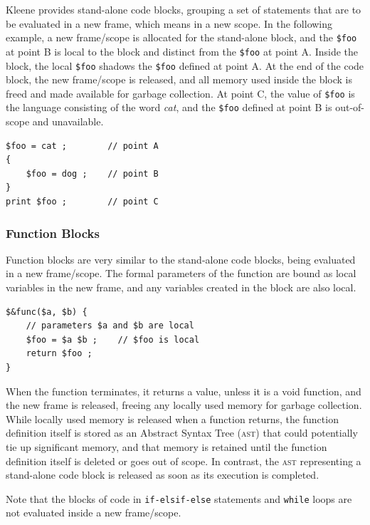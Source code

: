 \documentclass[letterpaper,12pt]{article}
\newcommand{\acro}{\textsc}
\begin{document}
Kleene provides stand-alone code blocks, grouping a set of statements
that are to be evaluated in a new frame, which means in a new scope.
In the following example, a new frame/scope is allocated for the
stand-alone block, and the \verb!$foo! at point B is local to the block
and distinct from the
\verb!$foo! at point A. Inside the block, the local \verb!$foo! shadows
the \verb!$foo! defined at point A.  At the end of the code block, the new
frame/scope is released, and all memory used inside the block is freed
and made available for garbage collection.  At point C, the value of \verb!$foo! is the
language consisting of the word \emph{cat}, and the \verb!$foo! defined
at point B is out-of-scope and unavailable.

\begin{Verbatim}[fontsize=\small]
$foo = cat ;        // point A
{
    $foo = dog ;    // point B
}
print $foo ;        // point C
\end{Verbatim}

\subsubsection{Function Blocks}

Function blocks are very similar to the stand-alone code blocks, being
evaluated in a new frame/scope.  The formal parameters of the function are
bound as local variables in the
new frame, and any variables created in the block are also local.


\begin{Verbatim}[fontsize=\small]
$&func($a, $b) {
    // parameters $a and $b are local
    $foo = $a $b ;    // $foo is local
    return $foo ;
}
\end{Verbatim}

\noindent
When the function terminates, it returns a value, unless it is a void function, and the
new frame is released, freeing any locally used memory for garbage
collection.  While locally used memory is released when a function returns, the
function definition itself is stored as an Abstract Syntax Tree (\acro{ast}) that could
potentially tie up 
significant memory, and that memory is retained until the function definition
itself is deleted or goes out of scope.  In contrast, the \acro{ast} representing a
stand-alone code block is released as soon as its execution is completed.

Note that the blocks of code in \texttt{if-elsif-else} statements and \texttt{while}
loops are not evaluated inside a new frame/scope.
\end{document}
